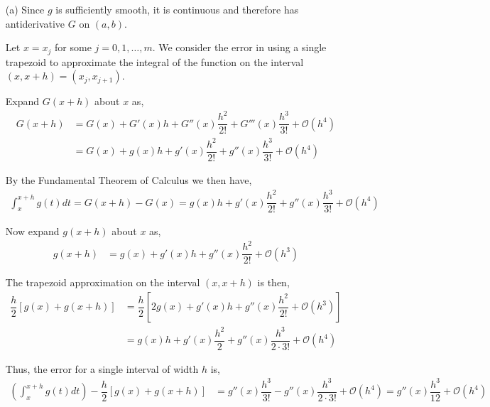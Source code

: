 \documentclass[10pt]{article}
\begin{document}
\begin{solution}[Solution]

\begin{enumerate}
    \item[(a)] Since \( g \) is sufficiently smooth, it is continuous and therefore has antiderivative \( G \) on \( (a,b) \).

        Let \( x=x_j \) for some \( j=0,1,\ldots, m \). We consider the error in using a single trapezoid to approximate the integral of the function on the interval \( (x,x+h) = (x_j,x_{j+1}) \).

        Expand \( G(x+h) \) about \( x \) as,
        \begin{align*}
            G(x+h) &= G(x) + G'(x)h + G''(x) \dfrac{h^2}{2!} + G'''(x) \dfrac{h^3}{3!} + \mathcal{O}(h^4) \\
            &= G(x) + g(x)h + g'(x) \dfrac{h^2}{2!} + g''(x) \dfrac{h^3}{3!}+\mathcal{O}(h^4)
        \end{align*}

        By the Fundamental Theorem of Calculus we then have,
        \begin{align*}
            \int_{x}^{x+h}g(t)dt = G(x+h) - G(x) = g(x)h + g'(x) \dfrac{h^2}{2!} + g''(x) \dfrac{h^3}{3!} + \mathcal{O}(h^4)
        \end{align*}

        Now expand \( g(x+h) \) about \( x \) as,
        \begin{align*}
            g(x+h) &= g(x) + g'(x)h + g''(x) \dfrac{h^2}{2!} + \mathcal{O}(h^3)
        \end{align*}

        The trapezoid approximation on the interval \( (x,x+h) \) is then,
        \begin{align*}
            \dfrac{h}{2}[g(x)+g(x+h)] &=
            \dfrac{h}{2}\left[2g(x) + g'(x)h + g''(x) \dfrac{h^2}{2!} + \mathcal{O}(h^3) \right] \\
            &= g(x) h + g'(x) \dfrac{h^2}{2} + g''(x) \dfrac{h^3}{2\cdot 3!} + \mathcal{O}(h^4)
        \end{align*}

        Thus, the error for a single interval of width \( h \) is,
        \begin{align*}
            \left( \int_{x}^{x+h}g(t)dt \right) - \dfrac{h}{2}[g(x)+g(x+h)] &=
            g''(x) \dfrac{h^3}{3!} - g''(x) \dfrac{h^3}{2\cdot 3!} + \mathcal{O}(h^4) = g''(x) \dfrac{h^3}{12} + \mathcal{O}(h^4)
        \end{align*}


\end{enumerate}
\end{solution}
\end{document}
